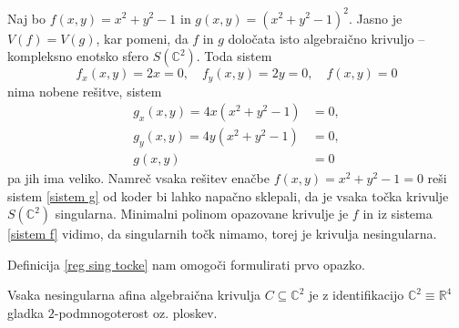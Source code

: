 \documentclass[mat1]{fmfdelo}
\numberwithin{equation}{section}
\newcommand{\R}{\mathbb R}
\newcommand{\C}{\mathbb C}
\theoremstyle{definition}
\begin{document}
\begin{primer*}
    Naj bo $f(x,y) = x^2 + y^2 - 1$ in $g(x,y) = (x^2 + y^2 - 1)^2$. Jasno je $V(f) = V(g)$, kar pomeni, da $f$ in $g$ določata isto algebraično krivuljo -- kompleksno enotsko sfero $S(\C^2)$. Toda sistem 
    \begin{equation}
        \label{sistem f}
        f_x(x,y) = 2x = 0, \quad f_y(x,y) = 2y = 0, \quad f(x,y) = 0
    \end{equation}
    nima nobene rešitve, sistem
    \begin{align}
        \label{sistem g}
        g_x(x,y) = 4x(x^2 + y^2 - 1) &= 0, \nonumber \\ 
        g_y(x,y) = 4y(x^2 + y^2 - 1) &= 0, \\
        g(x,y) &= 0 \nonumber
    \end{align}
    pa jih ima veliko. Namreč vsaka rešitev enačbe $f(x,y) = x^2 + y^2 - 1 = 0$ reši sistem \ref{sistem g} od koder bi lahko napačno sklepali, da je vsaka točka krivulje $S(\C^2)$ singularna. Minimalni polinom opazovane krivulje je $f$ in iz sistema \ref{sistem f} vidimo, da singularnih točk nimamo, torej je krivulja nesingularna. 
    
\end{primer*}

Definicija \ref{reg sing tocke} nam omogoči formulirati prvo opazko.

\begin{trditev}
    Vsaka nesingularna afina algebraična krivulja $C \subseteq \C^2$ je z identifikacijo $\C^2 \equiv \R^4$ gladka $2$-podmnogoterost oz. ploskev.
\end{trditev}
\end{document}
